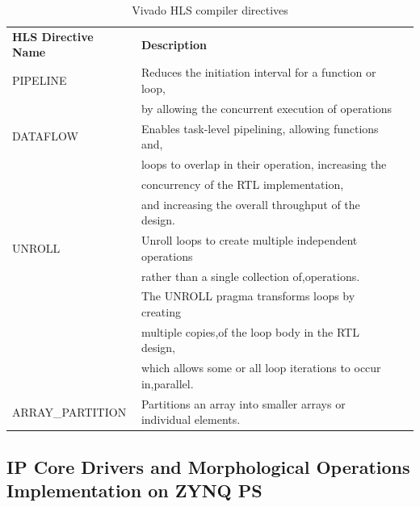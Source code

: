 \documentclass[12pt,a4paper]{report}
\begin{document}
\begin{table}[]
\centering
\caption{Vivado HLS compiler directives}
\label{pragma}
\begin{tabular}{|l|l|l}
\cline{1-2}
\textbf{HLS Directive Name} & \textbf{Description}                                                                                                                                                                                                                                                     &  \\ \cline{1-2}
PIPELINE                    & Reduces the initiation interval for a function or loop,\\ & by allowing the concurrent execution of operations                                                                                                                                                                &  \\ \cline{1-2}
DATAFLOW                    & Enables task-level pipelining, allowing functions and,\\ & loops to overlap in their operation, increasing the \\ & concurrency of the RTL implementation,\\ & and increasing the overall throughput of the design.                                                                    &  \\ \cline{1-2}
UNROLL                      & Unroll loops to create multiple independent operations\\ & rather than a single collection of,operations. \\ & The UNROLL pragma transforms loops by creating \\ & multiple copies,of the loop body in the RTL design, \\ & which allows some or all loop iterations to occur in,parallel. &  \\ \cline{1-2}
ARRAY\_PARTITION            & Partitions an array into smaller arrays or individual elements.                                                                                                                                                                                                          &  \\ \cline{1-2}
\end{tabular}
\end{table}


\subsection{IP Core Drivers and Morphological Operations Implementation on ZYNQ PS}
\end{document}
